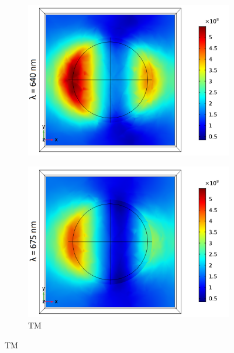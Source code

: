 \begin{figure}[htb!]
   
    \begin{subfigure}{0.32\textwidth}
        \centering
        \includegraphics[width=\linewidth]{figures/ch4/S5A/FieldDistribution/LSPR/Sample5A_TM_Slice@z=-05t_wl=640_notitle.png}
   \end{subfigure}
   \begin{subfigure}{0.32\textwidth}
        \centering
        \includegraphics[width=\linewidth]{figures/ch4/S5A/FieldDistribution/LSPR/Sample5A_TM_Slice@z=-05t_wl=675_notitle.png}
        \caption{TM}
        \vspace{-0.7cm}
   \end{subfigure}   

\end{figure}
